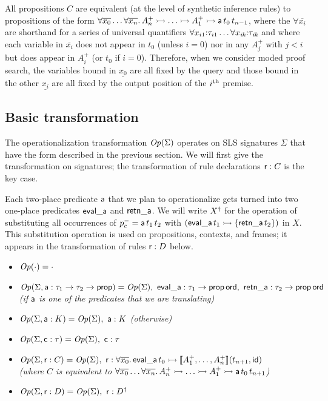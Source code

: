 All propositions $C$ are equivalent (at the level of synthetic
inference rules) to propositions of the form $\forall
\overline{x_0}\ldots \forall \overline{x_n}.\,A^+_n \rightarrowtail \ldots
\rightarrowtail A^+_1 \rightarrowtail {\sf a}\,t_{0}\,t_{n-1}$, where the $\forall
\overline{x_i}$ are shorthand for a series of universal quantifiers
$\forall {x_{i1}}{:}{\tau_{i1}} \ldots \forall {x_{\it
    ik}}{:}{\tau_{\it ik}}$ and where each variable in
$\overline{x_i}$ does not appear in $t_0$ (unless $i = 0$) nor in any
$A^+_j$ with $j < i$ but does appear in $A^+_i$ (or $t_0$ if $i =
0$). Therefore, when we consider moded proof search, the variables
bound in $\underline{x_0}$ are all fixed by the query and those bound
in the other $\underline{x_i}$ are all fixed by the output position of
the $i^{\rm th}$ premise.

\subsection{Basic transformation}
\label{sec:trans-basic}

The operationalization transformation ${\it Op}({\Sigma})$
operates on SLS signatures $\Sigma$ that have the form described in the
previous section. We
will first give the transformation on signatures; the transformation
of rule declarations ${\sf r} : C$ is the key case.

Each two-place predicate ${\sf a}$ that we plan to operationalize gets
turned into two one-place predicates ${\sf eval\_a}$ and ${\sf
  retn\_a}$.  We will write ${{X}^\dag}$ for the operation of
substituting all occurrences of $p^-_c = {\sf a}\,t_1\,t_2$ with
$({\sf eval\_a}\,t_1 \rightarrowtail \{ {\sf retn\_a}\,t_2 \})$ in $X$. This
substitution operation is used on propositions, contexts, and frames;
it appears in the transformation of rules ${\sf r} : D$ below.

\begin{itemize}
\item ${\it Op}({\cdot}) = \cdot$
\item ${\it Op}({\Sigma, {\sf a} : \tau_1 \rightarrow \tau_2
    \rightarrow {\sf prop}}) = {\it Op}({\Sigma}), ~ {\sf eval\_a} :
  \tau_1 \rightarrow {\sf prop\,ord}, ~ {\sf retn\_a} : \tau_2
  \rightarrow {\sf prop\,ord}$ \\ {\it (if $\sf a$ is one of the
    predicates that we are translating)}
\item ${\it Op}({\Sigma, {\sf a} : K}) = {\it Op}({\Sigma}), ~ {\sf a}
  : K$ {\it (otherwise)}
\item ${\it Op}({\Sigma, {\sf c} : \tau}) = {\it Op}({\Sigma}), ~ {\sf
    c} : \tau$ 
\item ${\it Op}({\Sigma, {\sf r} : C}) = {\it Op}({\Sigma}), ~ {\sf r}
  : \forall \overline{x_0}.\, {\sf eval\_a}\,t_0 \rightarrowtail \llbracket A^+_1,
  \ldots, A^+_n \rrbracket (t_{n+1}, {\sf id})$ \\ {\it (where $C$ is
    equivalent to $\forall \overline{x_0}\ldots \forall
    \overline{x_n}.\, A^+_n \rightarrowtail \ldots \rightarrowtail A^+_1 \rightarrowtail {\sf
      a}\,t_{0}\,t_{n+1}$)}
\item ${\it Op}({\Sigma, {\sf r} : D}) = {\it Op}({\Sigma}), ~ {\sf r}
  : {{D}^\dag}$
\end{itemize}

